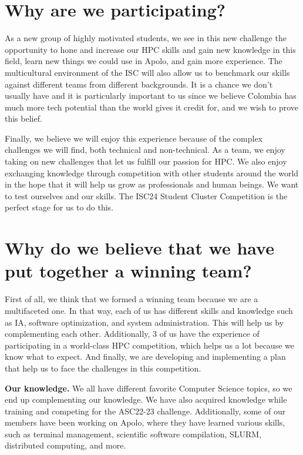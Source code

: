 \documentclass[11pt,a4paper,twocolumn]{article}
\begin{document}
    \section{Why are we participating?}

    As a new group of highly motivated students, we see in this new challenge the opportunity to hone and increase our HPC skills and gain new knowledge in this field, learn new things we could use in Apolo, and gain more experience. The multicultural environment of the ISC will also allow us to benchmark our skills against different teams from different backgrounds. It is a chance we don’t usually have and it is particularly important to us since we believe Colombia has much more tech potential than the world gives it credit for, and we wish to prove this belief.

    Finally, we believe we will enjoy this experience because of the complex challenges we will find, both technical and non-technical. As a team, we enjoy taking on new challenges that let us fulfill our passion for HPC. We also enjoy exchanging knowledge through competition with other students around the world in the hope that it will help us grow as professionals and human beings. We want to test ourselves and our skills. The ISC24 Student Cluster Competition is the perfect stage for us to do this.

    \section{Why do we believe that we have put together a winning team?}

    First of all, we think that we formed a winning team because we are a multifaceted one. In that way, each of us has different skills and knowledge such as IA, software optimization, and system administration. This will help us by complementing each other. Additionally, 3 of us have the experience of participating in a world-class HPC competition, which helps us a lot because we know what to expect. And finally, we are developing and implementing a plan that help us to face the challenges in this competition.

    \textbf{Our knowledge.} We all have different favorite Computer Science topics, so we end up complementing our knowledge. We have also acquired knowledge while training and competing for the ASC22-23 challenge. Additionally, some of our members have been working on Apolo, where they have learned various skills, such as terminal management, scientific software compilation, SLURM, distributed computing, and more.
\end{document}
